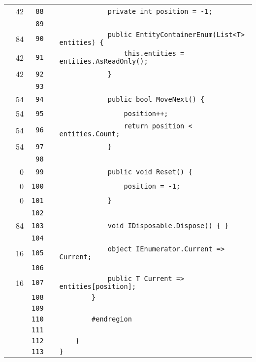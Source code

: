 \documentclass[a4paper,landscape,10pt]{article}
\begin{document}
\begin{longtable}[l]{lrrll}
\cellcolor{green} & 42 & \verb~88~ & & \verb~            private int position = -1;~\\
\cellcolor{gray} &  & \verb~89~ & & \verb~~\\
\cellcolor{green} & 84 & \verb~90~ & & \verb~            public EntityContainerEnum(List<T> entities) {~\\
\cellcolor{green} & 42 & \verb~91~ & & \verb~                this.entities = entities.AsReadOnly();~\\
\cellcolor{green} & 42 & \verb~92~ & & \verb~            }~\\
\cellcolor{gray} &  & \verb~93~ & & \verb~~\\
\cellcolor{green} & 54 & \verb~94~ & & \verb~            public bool MoveNext() {~\\
\cellcolor{green} & 54 & \verb~95~ & & \verb~                position++;~\\
\cellcolor{green} & 54 & \verb~96~ & & \verb~                return position < entities.Count;~\\
\cellcolor{green} & 54 & \verb~97~ & & \verb~            }~\\
\cellcolor{gray} &  & \verb~98~ & & \verb~~\\
\cellcolor{red} & 0 & \verb~99~ & & \verb~            public void Reset() {~\\
\cellcolor{red} & 0 & \verb~100~ & & \verb~                position = -1;~\\
\cellcolor{red} & 0 & \verb~101~ & & \verb~            }~\\
\cellcolor{gray} &  & \verb~102~ & & \verb~~\\
\cellcolor{green} & 84 & \verb~103~ & & \verb~            void IDisposable.Dispose() { }~\\
\cellcolor{gray} &  & \verb~104~ & & \verb~~\\
\cellcolor{green} & 16 & \verb~105~ & & \verb~            object IEnumerator.Current => Current;~\\
\cellcolor{gray} &  & \verb~106~ & & \verb~~\\
\cellcolor{green} & 16 & \verb~107~ & & \verb~            public T Current => entities[position];~\\
\cellcolor{gray} &  & \verb~108~ & & \verb~        }~\\
\cellcolor{gray} &  & \verb~109~ & & \verb~~\\
\cellcolor{gray} &  & \verb~110~ & & \verb~        #endregion~\\
\cellcolor{gray} &  & \verb~111~ & & \verb~~\\
\cellcolor{gray} &  & \verb~112~ & & \verb~    }~\\
\cellcolor{gray} &  & \verb~113~ & & \verb~}~\\
\end{longtable}
\newpage
\end{document}
